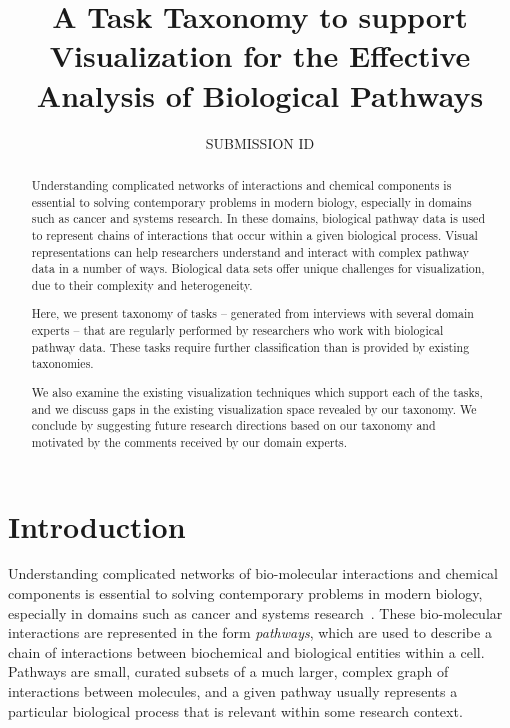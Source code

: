 \documentclass{egpubl}
\title[A Task Taxonomy to support Visualization for the Effective Analysis of Biological Pathways]%
      {A Task Taxonomy to support Visualization for the Effective Analysis of Biological Pathways}
\author[]{SUBMISSION ID}
\begin{document}

\maketitle

\begin{abstract}
Understanding complicated networks of interactions and chemical components is essential to solving contemporary problems in modern biology, especially in domains such as cancer and systems research.
In these domains, biological pathway data is used to represent chains of interactions that occur within a given biological process.
Visual representations can help researchers understand and interact with complex pathway data in a number of ways.
Biological data sets offer unique challenges for visualization, due to their complexity and heterogeneity.

Here, we present taxonomy of tasks -- generated from interviews with several domain experts -- that are regularly performed by researchers who work with biological pathway data.
These tasks require further classification than is provided by existing taxonomies.


We also examine the existing visualization techniques which support each of the tasks, and we discuss gaps in the existing visualization space revealed by our taxonomy.
We conclude by suggesting future research directions based on our taxonomy and motivated by the comments received by our domain experts.


\begin{classification} %
\end{classification}

\end{abstract}

\section{Introduction}

Understanding complicated networks of bio-molecular interactions and chemical components is essential to solving contemporary problems in modern biology, especially in domains such as cancer and systems research~\cite{hanahan2011hallmarks}.
These bio-molecular interactions are represented in the form \emph{pathways}, which are used to describe a chain of interactions between biochemical and biological entities within a cell.
Pathways are small, curated subsets of a much larger, complex graph of interactions between molecules, and a given pathway usually represents a particular biological process that is relevant within some research context.
\end{document}
